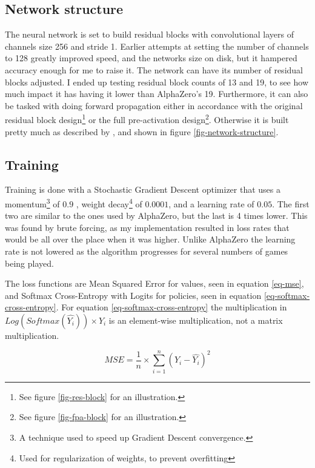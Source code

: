 \subsection{Network structure}
The neural network is set to build residual blocks with convolutional layers of channels size 256 and stride 1. Earlier attempts at setting the number of channels to 128 greatly improved speed, and the networks size on disk, but it hampered accuracy enough for me to raise it. The network can have its number of residual blocks adjusted. I ended up testing residual block counts of 13 and 19, to see how much impact it has having it lower than AlphaZero's 19. Furthermore, it can also be tasked with doing forward propagation either in accordance with the original residual block design\footnote{See figure \ref{fig-res-block} for an illustration.} or the full pre-activation design\footnote{See figure \ref{fig-fpa-block} for an illustration.}\cite{HeKaimingandZhangXiangyuandRenShaoqingandSun2016, He2016}. Otherwise it is built pretty much as described by \citeauthor{Silver2018}, and shown in figure \ref{fig-network-structure}. 

\subsection{Training}
Training is done with a Stochastic Gradient Descent optimizer that uses a momentum\footnote{A technique used to speed up Gradient Descent convergence.} of $0.9$ , weight decay\footnote{Used for regularization of weights, to prevent overfitting} of $0.0001$, and a learning rate of $0.05$. The first two are similar to the ones used by AlphaZero, but the last is 4 times lower. This was found by brute forcing, as my implementation resulted in loss rates that would be all over the place when it was higher. Unlike AlphaZero the learning rate is not lowered as the algorithm progresses for several numbers of games being played.

The loss functions are Mean Squared Error for values, seen in equation \ref{eq-mse}, and Softmax Cross-Entropy with Logits for policies, seen in equation \ref{eq-softmax-cross-entropy}. For equation \ref{eq-softmax-cross-entropy} the multiplication in $Log(Softmax(\hat{Y_i})) \times Y_i$ is an element-wise multiplication, not a matrix multiplication.

\begin{equation}
MSE = \frac{1}{n} \times \sum_{i = 1}^{n} \left(Y_i - \hat{Y_i}\right)^2
\label{eq-mse}
\end{equation}


